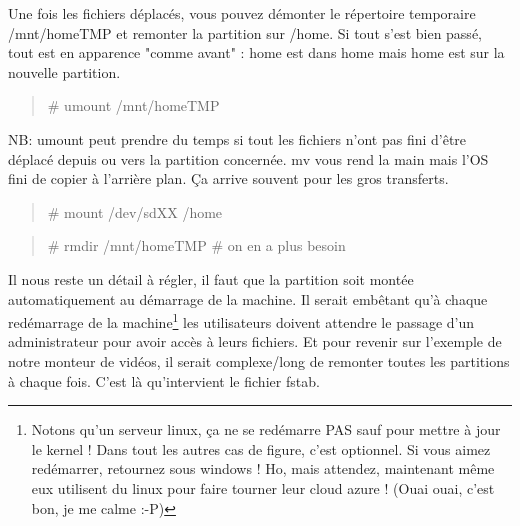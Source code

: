 \documentclass[a4paper]{article}
\newcommand{\commande}[1] {
    \begin{quote}
    \tt\raggedright #1 
    \end{quote}
}
\begin{document}
\par Une fois les fichiers déplacés, vous pouvez démonter le répertoire temporaire /mnt/homeTMP et remonter la partition sur /home. Si tout s'est bien passé, tout est en apparence "comme avant" : home est dans home mais home est sur la nouvelle partition.
\commande{\# umount /mnt/homeTMP}
\par NB: umount peut prendre du temps si tout les fichiers n'ont pas fini d'être déplacé depuis ou vers la partition concernée. mv vous rend la main mais l'OS fini de copier à l'arrière plan. Ça arrive souvent pour les gros transferts.
\commande{\# mount /dev/sdXX /home}
\commande{\# rmdir /mnt/homeTMP \# on en a plus besoin}
\par Il nous reste un détail à régler, il faut que la partition soit montée automatiquement au démarrage de la machine. Il serait embêtant qu'à chaque redémarrage de la machine\footnote{Notons qu'un serveur linux, ça ne se redémarre PAS sauf pour mettre à jour le kernel ! Dans tout les autres cas de figure, c'est optionnel. Si vous aimez redémarrer, retournez sous windows ! Ho, mais attendez, maintenant même eux utilisent du linux pour faire tourner leur cloud azure ! (Ouai ouai, c'est bon, je me calme :-P)} les utilisateurs doivent attendre le passage d'un administrateur pour avoir accès à leurs fichiers. Et pour revenir sur l'exemple de notre monteur de vidéos, il serait complexe/long de remonter toutes les partitions à chaque fois. C'est là qu'intervient le fichier fstab.
\end{document}
